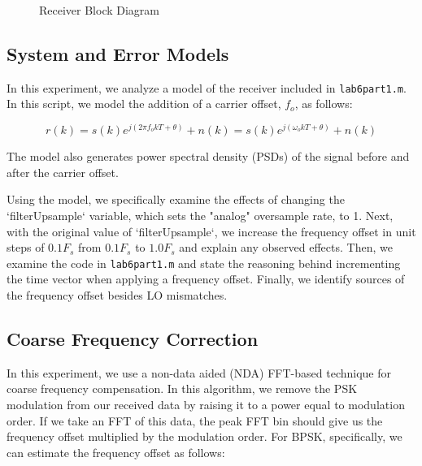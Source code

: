 \documentclass{article}
\begin{document}
\begin{figure}[H]
	\centerline{}
	\caption{Receiver Block Diagram}
	\label{fig::receiver_block_diagram}
\end{figure}

\subsection{System and Error Models}

In this experiment, we analyze a model of the receiver included in \texttt{lab6part1.m}. In this script, we model the addition of a carrier offset, $f_o$, as follows:

\begin{equation}
	r(k) = s(k)e^{j(2{\pi}f_okT+\theta)}+n(k) = s(k)e^{j(\omega_okT+\theta)}+n(k)
\end{equation}

\noindent The model also generates power spectral density (PSDs) of the signal before and after the carrier offset.

Using the model, we specifically examine the effects of changing the `filterUpsample` variable, which sets the "analog" oversample rate, to 1. Next, with the original value of `filterUpsample`, we increase the frequency offset in unit steps of $0.1F_s$ from $0.1F_s$ to $1.0F_s$ and explain any observed effects. Then, we examine the code in \texttt{lab6part1.m} and state the reasoning behind incrementing the time vector when applying a frequency offset. Finally, we identify sources of the frequency offset besides LO mismatches.

\subsection{Coarse Frequency Correction}

In this experiment, we use a non-data aided (NDA) FFT-based technique for coarse frequency compensation. In this algorithm, we remove the PSK modulation from our received data by raising it to a power equal to modulation order. If we take an FFT of this data, the peak FFT bin should give us the frequency offset multiplied by the modulation order. For BPSK, specifically, we can estimate the frequency offset as follows:
\end{document}
